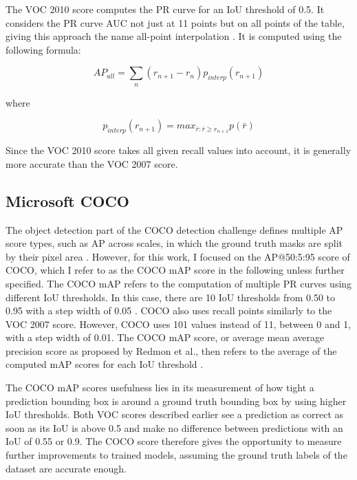 \documentclass[10pt]{book}
\begin{document}
The VOC 2010 score computes the \ac{PR curve} for an \ac{IoU} threshold of 0.5. It considers the \ac{PR curve} \ac{AUC} not just at 11 points but on all points of the table, giving this approach the name all-point interpolation \cite{padilla2020survey}. It is computed using the following formula:

$$AP_{all} = \sum_{n}(r_{n+1} - r_n)p_{interp}(r_{n+1})$$

where

$$p_{interp}(r_{n + 1}) = max_{\bar{r} : \bar{r} \geq r_{n+1}}p(\bar{r})$$

Since the VOC 2010 score takes all given recall values into account, it is generally more accurate than the VOC 2007 score.

\subsection{Microsoft COCO}

The object detection part of the \ac{COCO} detection challenge defines multiple AP score types, such as AP across scales, in which the ground truth masks are split by their pixel area \cite{padilla2020survey}. However, for this work, I focused on the AP@50:5:95 score of \ac{COCO}, which I refer to as the \ac{COCO} \ac{mAP} score in the following unless further specified. The \ac{COCO} \ac{mAP} refers to the computation of multiple \acp{PR curve} using different \ac{IoU} thresholds. In this case, there are 10 \ac{IoU} thresholds from 0.50 to 0.95 with a step width of 0.05 \cite{terven2023comprehensive}. \ac{COCO} also uses recall points similarly to the VOC 2007 score. However, \ac{COCO} uses 101 values instead of 11, between 0 and 1, with a step width of 0.01. %
The \ac{COCO} \ac{mAP} score, or average mean average precision score as proposed by Redmon et al., then refers to the average of the computed \ac{mAP} scores for each \ac{IoU} threshold \cite{redmon2018yolov3}. 

The \ac{COCO} \ac{mAP} scores usefulness lies in its measurement of how tight a prediction bounding box is around a ground truth bounding box by using higher \ac{IoU} thresholds. Both VOC scores described earlier see a prediction as correct as soon as its \ac{IoU} is above 0.5 and make no difference between predictions with an \ac{IoU} of 0.55 or 0.9. The \ac{COCO} score therefore gives the opportunity to measure further improvements to trained models, assuming the ground truth labels of the dataset are accurate enough.
\end{document}
